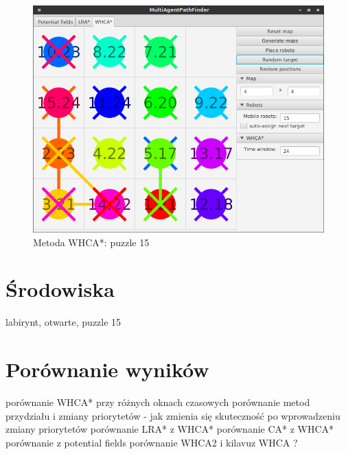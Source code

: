 \begin{figure}
	\centering
	\includegraphics[width=0.8\columnwidth]{img/robopath/puzzle-15}
	\caption{Metoda WHCA*: puzzle 15}
	\label{fig:app-tech-intellij}
\end{figure}

\section{Środowiska}
labirynt, otwarte, puzzle 15

\section{Porównanie wyników}
porównanie WHCA* przy różnych oknach czasowych
porównanie metod przydziału i zmiany priorytetów - jak zmienia się skuteczność  po wprowadzeniu zmiany priorytetów
porównanie LRA* z WHCA*
porównanie CA* z WHCA*
porównanie z potential fields
porównanie WHCA2 i kilavuz WHCA ?
